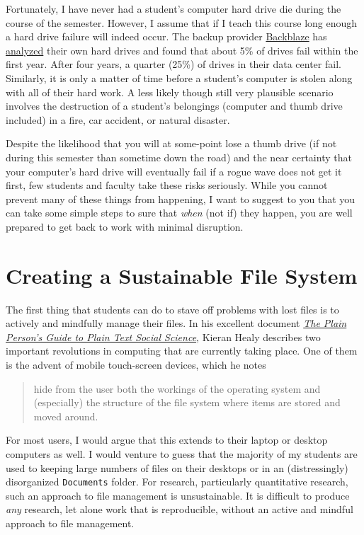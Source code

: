 \documentclass[]{book}
\theoremstyle{definition}
\theoremstyle{definition}
\theoremstyle{definition}
\theoremstyle{remark}
\begin{document}
Fortunately, I have never had a student's computer hard drive die during
the course of the semester. However, I assume that if I teach this
course long enough a hard drive failure will indeed occur. The backup
provider \href{https://www.backblaze.com/}{Backblaze} has
\href{https://www.backblaze.com/blog/how-long-do-disk-drives-last/}{analyzed}
their own hard drives and found that about 5\% of drives fail within the
first year. After four years, a quarter (25\%) of drives in their data
center fail. Similarly, it is only a matter of time before a student's
computer is stolen along with all of their hard work. A less likely
though still very plausible scenario involves the destruction of a
student's belongings (computer and thumb drive included) in a fire, car
accident, or natural disaster.

Despite the likelihood that you will at some-point lose a thumb drive
(if not during this semester than sometime down the road) and the near
certainty that your computer's hard drive will eventually fail if a
rogue wave does not get it first, few students and faculty take these
risks seriously. While you cannot prevent many of these things from
happening, I want to suggest to you that you can take some simple steps
to sure that \emph{when} (not if) they happen, you are well prepared to
get back to work with minimal disruption.

\hypertarget{creating-a-sustainable-file-system}{\section{Creating a
Sustainable File System}\label{creating-a-sustainable-file-system}}

The first thing that students can do to stave off problems with lost
files is to actively and mindfully manage their files. In his excellent
document \href{http://plain-text.co}{\emph{The Plain Person's Guide to
Plain Text Social Science}}, Kieran Healy describes two important
revolutions in computing that are currently taking place. One of them is
the advent of mobile touch-screen devices, which he notes

\begin{quote}
hide from the user both the workings of the operating system and
(especially) the structure of the file system where items are stored and
moved around.
\end{quote}

For most users, I would argue that this extends to their laptop or
desktop computers as well. I would venture to guess that the majority of
my students are used to keeping large numbers of files on their desktops
or in an (distressingly) disorganized \texttt{Documents} folder. For
research, particularly quantitative research, such an approach to file
management is unsustainable. It is difficult to produce \emph{any}
research, let alone work that is reproducible, without an active and
mindful approach to file management.
\end{document}
